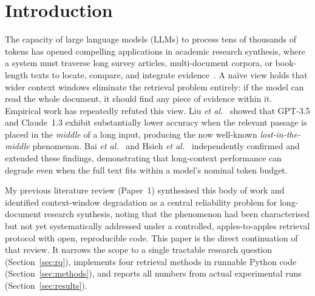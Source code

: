 \documentclass[sigconf,nonacm]{acmart}
\begin{document}


\maketitle

\section{Introduction}
\label{sec:intro}

The capacity of large language models (LLMs) to process tens of thousands of
tokens has opened compelling applications in academic research synthesis, where
a system must traverse long survey articles, multi-document corpora, or book-length
texts to locate, compare, and integrate evidence~\cite{surveylong2024}.
A naïve view holds that wider context windows eliminate the retrieval problem
entirely: if the model can read the whole document, it should find any piece of
evidence within it.
Empirical work has repeatedly refuted this view.
Liu \emph{et al.}~\cite{liu2023lost} showed that GPT-3.5 and Claude~1.3 exhibit
substantially lower accuracy when the relevant passage is placed in the
\emph{middle} of a long input, producing the now well-known \emph{lost-in-the-middle}
phenomenon.
Bai \emph{et al.}~\cite{bai2024longbench} and Hsieh \emph{et al.}~\cite{hsieh2024ruler}
independently confirmed and extended these findings, demonstrating that
long-context performance can degrade even when the full text fits within a
model's nominal token budget.

My previous literature review (Paper~1) synthesised this body of work and
identified context-window degradation as a central reliability problem for
long-document research synthesis, noting that the phenomenon had been characterised
but not yet systematically addressed under a controlled, apples-to-apples
retrieval protocol with open, reproducible code.
This paper is the direct continuation of that review.
It narrows the scope to a single tractable research question (Section~\ref{sec:rq}),
implements four retrieval methods in runnable Python code (Section~\ref{sec:methods}),
and reports all numbers from actual experimental runs (Section~\ref{sec:results}).
\end{document}
